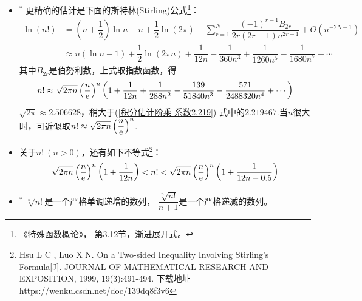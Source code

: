 \begin{itemize}[leftmargin=\inteval{\myitemleftmargin}pt,itemsep=
   \inteval{\myitemitempsep}pt,topsep=\inteval{\myitemtopsep}pt]
\item $^*$ 更精确的估计是下面的斯特林(Stirling)公式\footnote{《特殊函数概论》，
    第3.12节，渐进展开式。 }：
\begin{align}
    \ln (n!) &= \left(n+\dfrac{1}{2}\right)\ln n-n+\dfrac{1}{2}\ln(2\pi)+
    \sum_{r=1}^{N}\dfrac{(-1)^{r-1}B_{2r}}{2r(2r-1)n^{2r-1}}+O(n^{-2N-1}) \label{斯特林公式对数形式1-伯努利数} \\
    & \approx n(\ln n-1)+\dfrac{1}{2}\ln(2\pi n)+\dfrac{1}{12n}-
    \dfrac{1}{360n^3}+\dfrac{1}{1260n^5}-\dfrac{1}{1680n^7}+\cdots 
    \label{斯特林公式对数形式2}
\end{align}
其中$ B_{2r} $是伯努利数，上式取指数函数，得
\begin{gather}\label{斯特林公式指数形式}
    n!\approx \sqrt{2\pi n}\left(\dfrac{n}{\mathrm{e}}\right)^n \left(1+
    \dfrac{1}{12n}+\dfrac{1}{288n^2}-\dfrac{139}{51840n^3}-
    \dfrac{571}{2488320n^4}+\cdots \right)   
\end{gather}
$ \sqrt{2\pi}\approx 2.506628 $，稍大于(\ref{积分估计阶乘-系数2.219})
式中的$ 2.219467 $.当$ n $很大时，可近似取$ n!\approx \sqrt{2\pi n}\left(\dfrac{n}{\mathrm{e}}\right)^n $.

\item 关于$ n!\ (n>0)$，还有如下不等式\footnote{Hsu L C ,  Luo X N. On a 
    Two-sided Inequality Involving Stirling's Formula[J]. JOURNAL OF MATHEMATICAL RESEARCH AND EXPOSITION, 1999, 19(3):491-494. 
    下载地址 https://wenku.csdn.net/doc/139dq8f3v6}：
\begin{gather}\label{阶乘-斯特林不等式}
    \sqrt{2\pi n}\left(\dfrac{n}{\mathrm{e}}\right)^n \left(1+\dfrac{1}{12n}\right)
    <n!<\sqrt{2\pi n}\left(\dfrac{n}{\mathrm{e}}\right)^n \left(1+
    \dfrac{1}{12n-0.5}\right)
\end{gather}

\item $^*$ $ \sqrt[n]{n!} $是一个严格单调递增的数列，
$ \dfrac{\sqrt[n]{n!}}{n+1} $是一个严格递减的数列。\\


\end{itemize}

